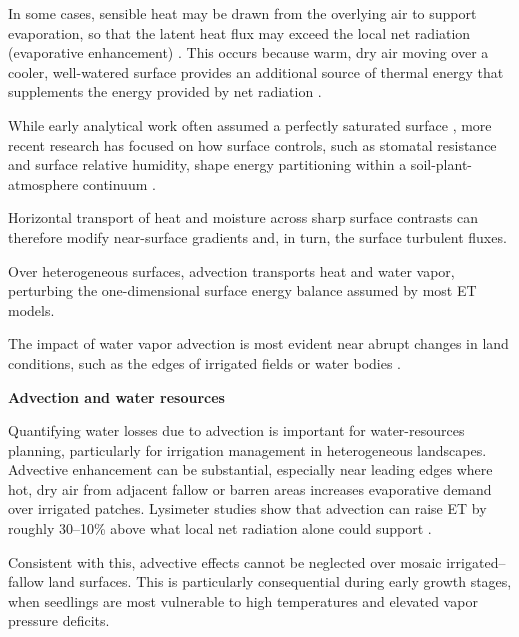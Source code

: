 \documentclass{article}
\begin{document}
     In some cases, sensible heat may be drawn from the overlying air to support evaporation, so that the latent heat flux may exceed the local net radiation (evaporative enhancement) \citep{yang2013new, kool_within-field_2018}.  
     This occurs because warm, dry air moving over a cooler, well-watered surface provides an additional source of thermal energy that supplements the energy provided by net radiation \cite{spronken2000advection}.

    While early analytical work often assumed a perfectly saturated surface \cite{lang1974influence, rao1974local}, more recent research has focused on how surface controls, such as stomatal resistance and surface relative humidity, shape energy partitioning within a soil-plant-atmosphere continuum \cite{baldocchi1995intra}. 

    Horizontal transport of heat and moisture across sharp surface contrasts can therefore modify near-surface gradients and, in turn, the surface turbulent fluxes.

    
    Over heterogeneous surfaces, advection transports heat and water vapor, perturbing the one-dimensional surface energy balance assumed by most ET models.

    The impact of water vapor advection is most evident near abrupt changes in land conditions, such as the edges of irrigated fields or water bodies \cite{rao1974local, higgins2013measured}.

    
    \textbf{Advection and water resources}

    
    Quantifying water losses due to advection is important for water-resources planning, particularly for irrigation management in heterogeneous landscapes. Advective enhancement can be substantial, especially near leading edges where hot, dry air from adjacent fallow or barren areas increases evaporative demand over irrigated patches. Lysimeter studies show that advection can raise ET by roughly 30–10\% above what local net radiation alone could support \cite{rijks1971water, rosenberg1978extreme, spronken2000advection}. 

    Consistent with this, advective effects cannot be neglected over mosaic irrigated–fallow land surfaces.
    This is particularly consequential during early growth stages, when seedlings are most vulnerable to high temperatures and elevated vapor pressure deficits.
\end{document}
